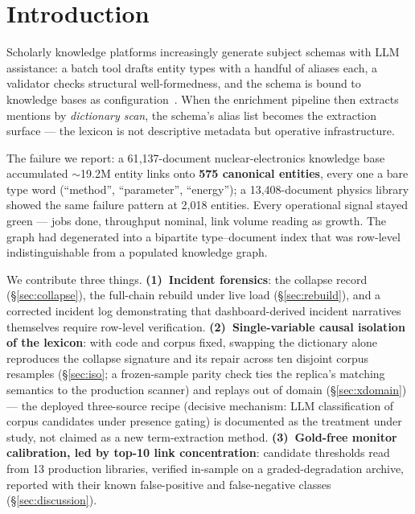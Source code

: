 \documentclass[sigconf,nonacm,anonymous]{acmart}
\begin{document}

\maketitle

\section{Introduction}\label{sec:intro}

Scholarly knowledge platforms increasingly generate subject schemas with
LLM assistance: a batch tool drafts entity types with a handful of aliases
each, a validator checks structural well-formedness, and the schema is
bound to knowledge bases as configuration~\cite{llmonto}. When the
enrichment pipeline then extracts mentions by \emph{dictionary scan}, the
schema's alias list becomes the extraction surface --- the lexicon is not
descriptive metadata but operative infrastructure.

The failure we report: a 61{,}137-document nuclear-electronics knowledge
base accumulated ${\sim}$19.2M entity links onto \textbf{575 canonical
entities}, every one a bare type word (``method'', ``parameter'',
``energy''); a 13{,}408-document physics library showed the same failure
pattern at 2{,}018 entities. Every operational signal stayed green ---
jobs done, throughput nominal, link volume reading as growth. The graph
had degenerated into a bipartite type--document index that was
row-level indistinguishable from a populated knowledge graph.

We contribute three things. \textbf{(1)~Incident forensics}: the
collapse record (\S\ref{sec:collapse}), the full-chain rebuild under
live load (\S\ref{sec:rebuild}), and a corrected incident log
demonstrating that dashboard-derived incident narratives themselves
require row-level verification. \textbf{(2)~Single-variable causal
isolation of the lexicon}: with code and corpus fixed, swapping the
dictionary alone reproduces the collapse signature and its repair
across ten disjoint corpus resamples (\S\ref{sec:iso}; a
frozen-sample parity check ties the replica's matching semantics to
the production scanner) and replays out of domain
(\S\ref{sec:xdomain}) --- the deployed three-source recipe (decisive
mechanism: LLM classification of corpus candidates under presence
gating) is documented as the treatment under study, not claimed as a
new term-extraction method. \textbf{(3)~Gold-free monitor calibration,
led by top-10 link concentration}: candidate thresholds read from 13
production libraries, verified in-sample on a graded-degradation
archive, reported with their known false-positive and false-negative
classes (\S\ref{sec:discussion}).
\end{document}

